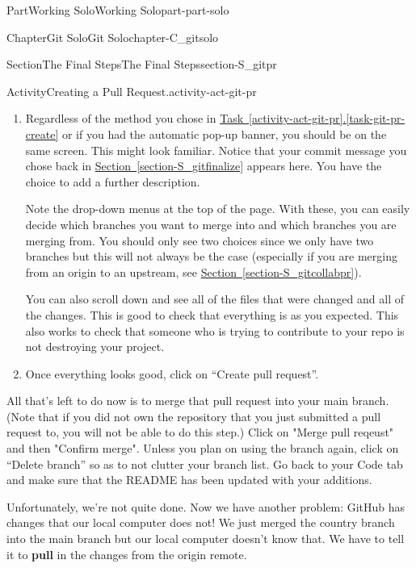 \documentclass[oneside,10pt,]{book}
\newcommand{\xreffont}{\relax}
\newcommand{\terminology}[1]{\textbf{#1}}
\begin{document}
\begin{partptx}{Part}{Working Solo}{}{Working Solo}{}{}{part-part-solo}
\begin{chapterptx}{Chapter}{Git Solo}{}{Git Solo}{}{}{chapter-C_gitsolo}
\begin{sectionptx}{Section}{The Final Steps}{}{The Final Steps}{}{}{section-S_gitpr}
\begin{activity}{Activity}{Creating a Pull Request.}{activity-act-git-pr}
\begin{enumerate}[font=\bfseries,label=(\alph*),ref=\alph*]
\begin{enumerate}
\item{}Navigate to the Pull requests tab. Click on the button near the top right that says ``New pull request''. Select the branch you want to pull into main from either the ``Compare'' drop-down menu at the top or the example comparisons table. Click ``Create pull request''.%
\end{enumerate}
%
\item\label{task-git-pr-open}Regardless of the method you chose in \hyperref[task-git-pr-create]{Task~{\xreffont\ref{activity-act-git-pr}}.{\xreffont\ref{task-git-pr-create}}} or if you had the automatic pop-up banner, you should be on the same screen. This might look familiar. Notice that your commit message you chose back in \hyperref[section-S_gitfinalize]{Section~{\xreffont\ref{section-S_gitfinalize}}} appears here. You have the choice to add a further description.%
\par
Note the drop-down menus at the top of the page. With these, you can easily decide which branches you want to merge into and which branches you are merging from. You should only see two choices since we only have two branches but this will not always be the case (especially if you are merging from an origin to an upstream, see \hyperref[section-S_gitcollabpr]{Section~{\xreffont\ref{section-S_gitcollabpr}}}).%
\par
You can also scroll down and see all of the files that were changed and all of the changes. This is good to check that everything is as you expected. This also works to check that someone who is trying to contribute to your repo is not destroying your project.%
\item{}Once everything looks good, click on ``Create pull request''.%
\end{enumerate}%
All that's left to do now is to merge that pull request into your main branch. (Note that if you did not own the repository that you just submitted a pull request to, you will not be able to do this step.) Click on "Merge pull reqeust" and then "Confirm merge". Unless you plan on using the branch again, click on ``Delete branch'' so as to not clutter your branch list. Go back to your Code tab and make sure that the README has been updated with your additions.%
\end{activity}%
 Unfortunately, we're not quite done. Now we have another problem: GitHub has changes that our local computer does not! We just merged the country branch into the main branch but our local computer doesn't know that. We have to tell it to \terminology{pull} in the changes from the origin remote.%

\end{sectionptx}
\end{chapterptx}
\end{partptx}
\end{document}
